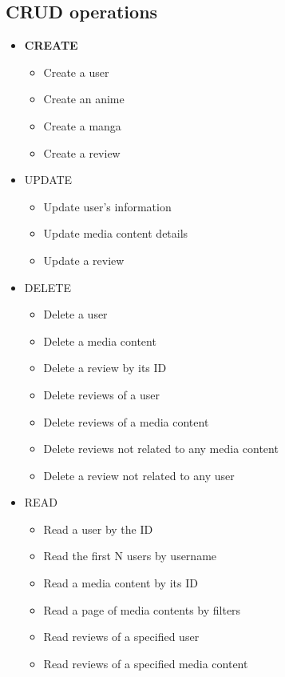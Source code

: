 \subsection*{CRUD operations}
\begin{itemize}
  \item \textbf{CREATE}
  \begin{itemize}
      \item Create a user
      \item Create an anime
      \item Create a manga
      \item Create a review
  \end{itemize}

  \item{UPDATE}
  \begin{itemize}
      \item Update user's information
      \item Update media content details
      \item Update a review
  \end{itemize}

  \item{DELETE}
  \begin{itemize}
      \item Delete a user
      \item Delete a media content
      \item Delete a review by its ID 
      \item Delete reviews of a user
      \item Delete reviews of a media content
      \item Delete reviews not related to any media content
      \item Delete a review not related to any user
  \end{itemize}

  \item{READ}
  \begin{itemize}
      \item Read a user by the ID
      \item Read the first N users by username
      \item Read a media content by its ID
      \item Read a page of media contents by filters
      \item Read reviews of a specified user
      \item Read reviews of a specified media content
  \end{itemize}
\end{itemize}

